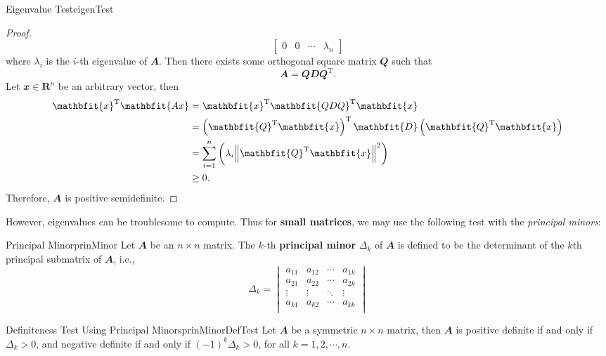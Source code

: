 \documentclass[math]{amznotes}
\theoremstyle{remark}
\begin{document}
\begin{thmbox}{Eigenvalue Test}{eigenTest}
\begin{proof}
\begin{displaymath}
\begin{bmatrix}
                0 & 0 & \cdots & \lambda_n
            \end{bmatrix}
        \end{displaymath}
        where $\lambda_i$ is the $i$-th eigenvalue of $\mathbfit{A}$. Then there exists some orthogonal square matrix $\mathbfit{Q}$ such that 
        \begin{equation*}
            \mathbfit{A} = \mathbfit{QDQ}^{\mathrm{T}}.
        \end{equation*}
        Let $\mathbfit{x} \in \mathbf{R}^n$ be an arbitrary vector, then 
        \begin{align*}
            \mathbfit{x}^{\mathrm{T}}\mathbfit{Ax} & = \mathbfit{x}^{\mathrm{T}}\mathbfit{QDQ}^{\mathrm{T}}\mathbfit{x} \\
            & = \left(\mathbfit{Q}^{\mathrm{T}}\mathbfit{x}\right)^{\mathrm{T}}\mathbfit{D}\left(\mathbfit{Q}^{\mathrm{T}}\mathbfit{x}\right) \\
            & = \sum_{i = 1}^{n}\left(\lambda_i\norm{\mathbfit{Q}^{\mathrm{T}}\mathbfit{x}}^2\right) \\
            & \geq 0.
        \end{align*}
        Therefore, $\mathbfit{A}$ is positive semidefinite.
    \end{proof}
\end{thmbox}
However, eigenvalues can be troublesome to compute. Thus for \textbf{small matrices}, we may use the following test with the \textit{principal minors}:
\begin{dfnbox}{Principal Minor}{prinMinor}
    Let $\mathbfit{A}$ be an $n \times n$ matrix. The $k$-th {\color{red} \textbf{principal minor}} $\Delta_k$ of $\mathbfit{A}$ is defined to be the determinant of the $k$th principal submatrix of $\mathbfit{A}$, i.e.,
    \begin{equation*}
        \Delta_k = \begin{vmatrix}
            a_{11} & a_{12} & \cdots & a_{1k} \\
            a_{21} & a_{22} & \cdots & a_{2k} \\
            \vdots & \vdots & \ddots & \vdots \\
            a_{k1} & a_{k2} & \cdots & a_{kk} \\
        \end{vmatrix}
    \end{equation*}
\end{dfnbox}
\begin{thmbox}{Definiteness Test Using Principal Minors}{prinMinorDefTest}
    Let $\mathbfit{A}$ be a symmetric $n \times n$ matrix, then $\mathbfit{A}$ is positive definite if and only if $\Delta_k > 0$, and negative definite if and only if $(-1)^k\Delta_k > 0$, for all $k = 1, 2, \cdots, n$.
\end{thmbox}
\end{document}
